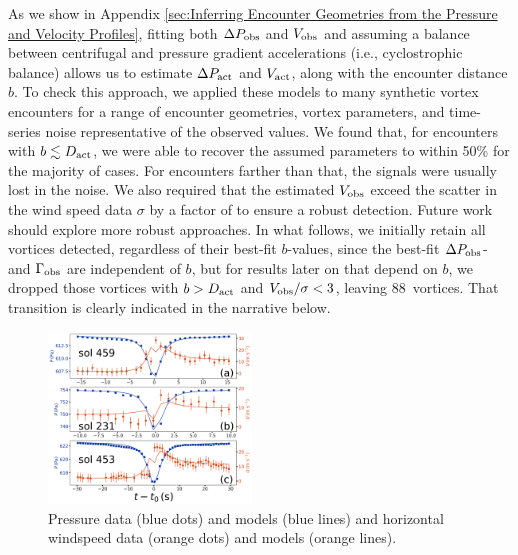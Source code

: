 \documentclass[linenumbers,trackchanges]{aastex63}
\newcommand{\boverDactltone}{88}
\begin{document}
As we show in Appendix \ref{sec:Inferring Encounter Geometries from the Pressure and Velocity Profiles}, fitting both $\Delta P_{\rm obs}$ and $V_{\rm obs}$ and assuming a balance between centrifugal and pressure gradient accelerations (i.e., cyclostrophic balance) allows us to estimate $\Delta P_{\rm act}$ and $V_{\rm act}$, along with the encounter distance $b$. To check this approach, we applied these models to many synthetic vortex encounters for a range of encounter geometries, vortex parameters, and time-series noise representative of the observed values. We found that, for encounters with $b \lesssim D_{\rm act}$, we were able to recover the assumed parameters to within 50\% for the majority of cases. For encounters farther than that, the signals were usually lost in the noise. We also required that the estimated $V_{\rm obs}$ exceed the scatter in the wind speed data $\sigma$ by a factor of  to ensure a robust detection. Future work should explore more robust approaches. In what follows, we initially retain all vortices detected, regardless of their best-fit $b$-values, since the best-fit $\Delta P_{\rm obs}$- and $\Gamma_{\rm obs}$ are independent of $b$, but for results later on that depend on $b$, we dropped those vortices with $b > D_{\rm act}$ and $V_{\rm obs}/\sigma < 3$, leaving \boverDactltone\ vortices. That transition is clearly indicated in the narrative below.

\begin{figure}
\centering
\includegraphics[width=0.48\textwidth]{figures/vortices_and_windspeed.png}
\caption{Pressure data (blue dots) and models (blue lines) and horizontal windspeed data (orange dots) and models (orange lines). \label{fig:vortices_and_windspeed}}
\end{figure}
\end{document}
